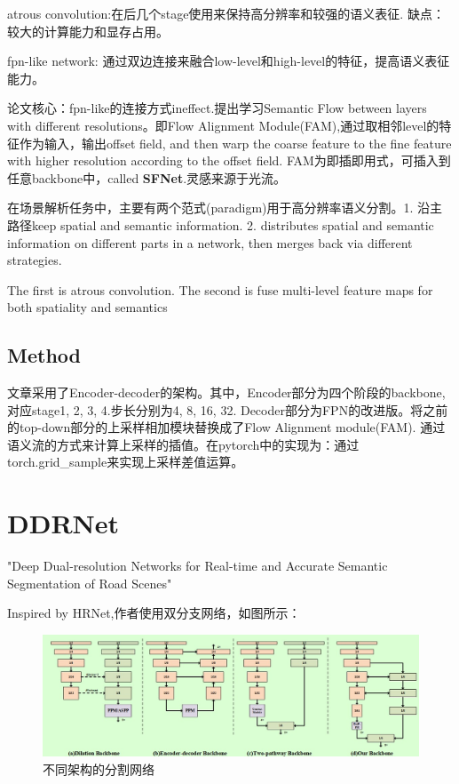 \documentclass{article}
\begin{document}
atrous convolution:在后几个stage使用来保持高分辨率和较强的语义表征. 缺点：较大的计算能力和显存占用。

fpn-like network: 通过双边连接来融合low-level和high-level的特征，提高语义表征能力。

论文核心：fpn-like的连接方式ineffect.提出学习Semantic Flow between layers with different resolutions。即Flow Alignment Module(FAM),通过取相邻level的特征作为输入，输出offset field, and then warp the coarse feature to the fine feature with higher resolution according to the offset field. FAM为即插即用式，可插入到任意backbone中，called \textbf{SFNet}.灵感来源于光流。

在场景解析任务中，主要有两个范式(paradigm)用于高分辨率语义分割。1. 沿主路径keep spatial and semantic information. 2. distributes spatial and semantic information on different parts in a network, then merges back via different strategies.

The first is atrous convolution. The second is fuse multi-level feature maps for both spatiality and semantics

\subsection{Method}
文章采用了Encoder-decoder的架构。其中，Encoder部分为四个阶段的backbone,对应stage1, 2, 3, 4.步长分别为4, 8, 16, 32. Decoder部分为FPN的改进版。将之前的top-down部分的上采样相加模块替换成了Flow Alignment module(FAM). 通过语义流的方式来计算上采样的插值。在pytorch中的实现为：通过torch.grid{\_}sample来实现上采样差值运算。	

\section{DDRNet}
"Deep Dual-resolution Networks for Real-time and Accurate Semantic Segmentation of Road Scenes"\cite{hong2021deep}

Inspired by HRNet,作者使用双分支网络，如图所示：
\begin{figure}[htbp]
\centering
\includegraphics[scale=0.3]{image/DDR_arch.jpg}
\caption{不同架构的分割网络}
\label{Fig.ddr_arch}
\end{figure}
\end{document}
